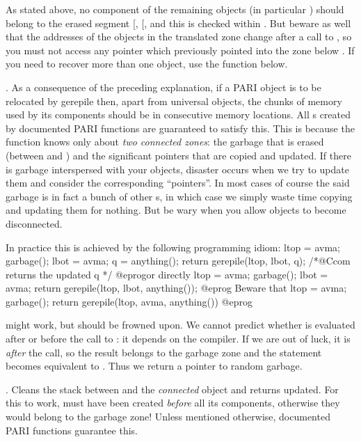 As stated above, no component of the remaining objects (in particular
) should belong to the erased segment [, [, and
this is checked within . But beware as well that the addresses
of the objects in the translated zone change after a call to ,
so you must not access any pointer which previously pointed into the zone
below . If you need to recover more than one object, use the
 function below.

.
As a consequence of the preceding explanation, if a PARI object is to be
relocated by \hbox{gerepile} then, apart from universal objects, the chunks
of memory used by its components should be in consecutive memory locations.
All s created by documented PARI functions are guaranteed to satisfy
this. This is because the  function knows only about \emph{two
connected zones}: the garbage that is erased (between  and
) and the significant pointers that are copied and updated. If
there is garbage interspersed with your objects, disaster occurs when we try
to update them and consider the corresponding ``pointers''. In most cases of
course the said garbage is in fact a bunch of other s, in which case
we simply waste time copying and updating them for nothing. But be wary when
you allow objects to become disconnected.

\noindent In practice this is achieved by the following programming idiom:
\bprog
  ltop = avma; garbage(); lbot = avma; q = anything();
  return gerepile(ltop, lbot, q); /*@Ccom returns the updated q */
@eprog\noindent or directly
\bprog
  ltop = avma; garbage(); lbot = avma;
  return gerepile(ltop, lbot, anything());
@eprog\noindent
Beware that
\bprog
  ltop = avma; garbage();
  return gerepile(ltop, avma, anything())
@eprog

\noindent might work, but should be frowned upon. We cannot predict whether
 is evaluated after or before the call to : it
depends on the compiler. If we are out of luck, it is \emph{after} the
call, so the result belongs to the garbage zone and the 
statement becomes equivalent to . Thus we return a
pointer to random garbage.


. Cleans the stack between
 and the \emph{connected} object  and returns 
updated. For this to work,  must have been created \emph{before} all
its components, otherwise they would belong to the garbage zone! Unless
mentioned otherwise, documented PARI functions guarantee this.

